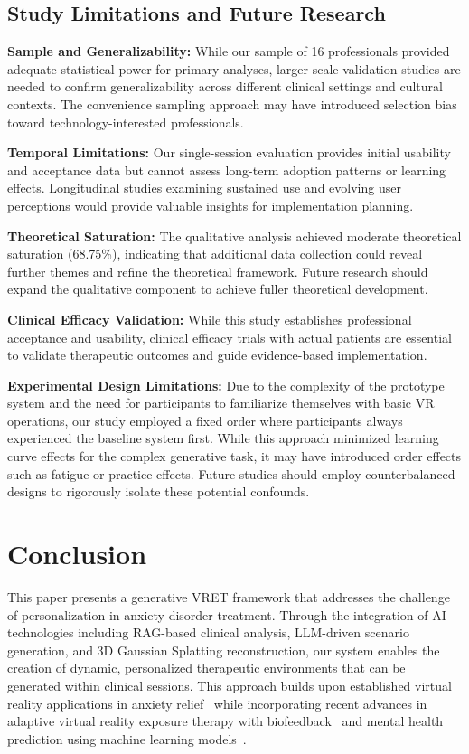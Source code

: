 \documentclass[]{interact}
\begin{document}
\subsection{Study Limitations and Future Research}

\textbf{Sample and Generalizability:} While our sample of 16 professionals provided adequate statistical power for primary analyses, larger-scale validation studies are needed to confirm generalizability across different clinical settings and cultural contexts. The convenience sampling approach may have introduced selection bias toward technology-interested professionals.

\textbf{Temporal Limitations:} Our single-session evaluation provides initial usability and acceptance data but cannot assess long-term adoption patterns or learning effects. Longitudinal studies examining sustained use and evolving user perceptions would provide valuable insights for implementation planning.

\textbf{Theoretical Saturation:} The qualitative analysis achieved moderate theoretical saturation (68.75\%), indicating that additional data collection could reveal further themes and refine the theoretical framework. Future research should expand the qualitative component to achieve fuller theoretical development.

\textbf{Clinical Efficacy Validation:} While this study establishes professional acceptance and usability, clinical efficacy trials with actual patients are essential to validate therapeutic outcomes and guide evidence-based implementation.

\textbf{Experimental Design Limitations:} Due to the complexity of the prototype system and the need for participants to familiarize themselves with basic VR operations, our study employed a fixed order where participants always experienced the baseline system first. While this approach minimized learning curve effects for the complex generative task, it may have introduced order effects such as fatigue or practice effects. Future studies should employ counterbalanced designs to rigorously isolate these potential confounds.

\section{Conclusion}

This paper presents a generative VRET framework that addresses the challenge of personalization in anxiety disorder treatment. Through the integration of AI technologies including RAG-based clinical analysis, LLM-driven scenario generation, and 3D Gaussian Splatting reconstruction, our system enables the creation of dynamic, personalized therapeutic environments that can be generated within clinical sessions. This approach builds upon established virtual reality applications in anxiety relief~\cite{li2022application} while incorporating recent advances in adaptive virtual reality exposure therapy with biofeedback~\cite{zelis2025adaptive} and mental health prediction using machine learning models~\cite{kamoji2024mental}.
\end{document}
